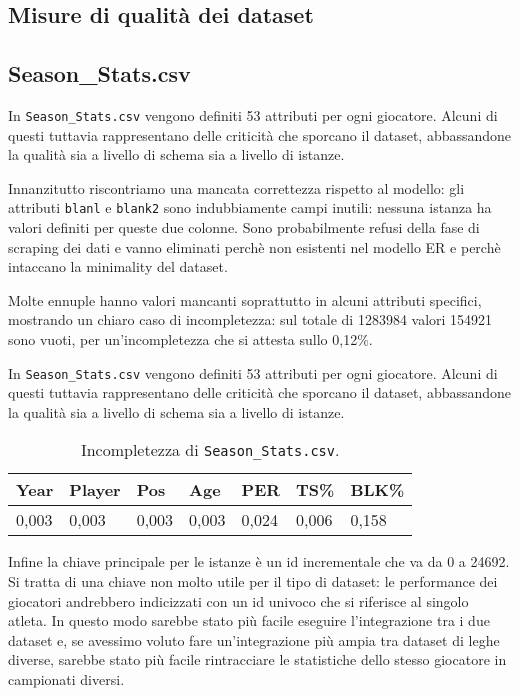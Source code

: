 \subsection{Misure di qualità dei dataset}

\subsection{Season\_Stats.csv}
In \texttt{Season\_Stats.csv} vengono definiti 53 attributi per ogni giocatore. Alcuni di questi tuttavia rappresentano delle criticità che sporcano il dataset, abbassandone la qualità sia a livello di schema sia a livello di istanze.
\par
Innanzitutto riscontriamo una mancata correttezza rispetto al modello: gli attributi \texttt{blanl} e \texttt{blank2} sono indubbiamente campi inutili: nessuna istanza ha valori definiti per queste due colonne. Sono probabilmente refusi della fase di scraping dei dati e vanno eliminati perchè non esistenti nel modello ER e perchè intaccano la minimality del dataset.
\par
Molte ennuple hanno valori mancanti soprattutto in alcuni attributi specifici, mostrando un chiaro caso di incompletezza: sul totale di 1283984 valori 154921 sono vuoti, per un’incompletezza che si attesta sullo 0,12\%.

In \texttt{Season\_Stats.csv} vengono definiti 53 attributi per ogni giocatore. Alcuni di questi tuttavia rappresentano delle criticità che sporcano il dataset, abbassandone la qualità sia a livello di schema sia a livello di istanze.

\begin{center}
	\begin{longtable}[m]{|m{3em} m{3em} m{3em} m{3em} m{3em} m{3em} m{3em}|} 

		\caption{Incompletezza di \texttt{Season\_Stats.csv}.\label{long}}\\
		\hline
		\bfseries{Year} & \bfseries{Player} & \bfseries{Pos} & \bfseries{Age} & \bfseries{PER} & \bfseries{TS\%} & \bfseries{BLK\%} \\ 
		\hline
		0,003 & 0,003 & 0,003 & 0,003 & 0,024 & 0,006 & 0,158 \\
		\hline
	\end{longtable}
\end{center}

Infine la chiave principale per le istanze è un id incrementale che va da 0 a 24692. Si tratta di una chiave non molto utile per il tipo di dataset: le performance dei giocatori andrebbero indicizzati con un id univoco che si riferisce al singolo atleta. In questo modo sarebbe stato più facile eseguire l’integrazione tra i due dataset e, se avessimo voluto fare un’integrazione più ampia tra dataset di leghe diverse, sarebbe stato più facile rintracciare le statistiche dello stesso giocatore in campionati diversi.

